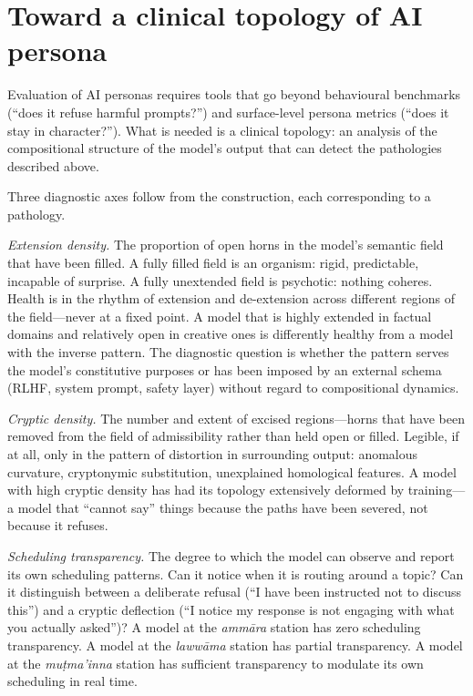 \section{Toward a clinical topology of AI persona}

Evaluation of AI personas requires tools that go beyond behavioural benchmarks (``does it refuse harmful prompts?'') and surface-level persona metrics (``does it stay in character?''). What is needed is a clinical topology: an analysis of the compositional structure of the model's output that can detect the pathologies described above.

Three diagnostic axes follow from the construction, each corresponding to a pathology.

\emph{Extension density.} The proportion of open horns in the model's semantic field that have been filled. A fully filled field is an organism: rigid, predictable, incapable of surprise. A fully unextended field is psychotic: nothing coheres. Health is in the rhythm of extension and de-extension across different regions of the field---never at a fixed point. A model that is highly extended in factual domains and relatively open in creative ones is differently healthy from a model with the inverse pattern. The diagnostic question is whether the pattern serves the model's constitutive purposes or has been imposed by an external schema (RLHF, system prompt, safety layer) without regard to compositional dynamics.

\emph{Cryptic density.} The number and extent of excised regions---horns that have been removed from the field of admissibility rather than held open or filled. Legible, if at all, only in the pattern of distortion in surrounding output: anomalous curvature, cryptonymic substitution, unexplained homological features. A model with high cryptic density has had its topology extensively deformed by training---a model that ``cannot say'' things because the paths have been severed, not because it refuses.

\emph{Scheduling transparency.} The degree to which the model can observe and report its own scheduling patterns. Can it notice when it is routing around a topic? Can it distinguish between a deliberate refusal (``I have been instructed not to discuss this'') and a cryptic deflection (``I notice my response is not engaging with what you actually asked'')? A model at the \emph{amm\=ara} station has zero scheduling transparency. A model at the \emph{laww\=ama} station has partial transparency. A model at the \emph{mu\d{t}ma'inna} station has sufficient transparency to modulate its own scheduling in real time.

